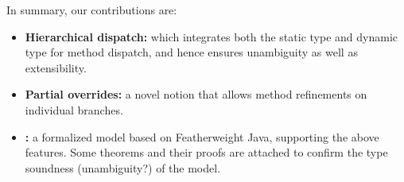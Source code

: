 In summary, our contributions are: 
\begin{itemize}
	\item \textbf{Hierarchical dispatch:} which integrates both the static type and dynamic type for method dispatch, and hence
	ensures unambiguity as well as extensibility.
	\item \textbf{Partial overrides:} a novel notion that allows method refinements on individual branches.
	\item \textbf{\name:} a formalized model based on Featherweight Java, supporting the above features. Some theorems and their proofs
	are attached to confirm the type soundness (unambiguity?) of the model.
\end{itemize}

 
